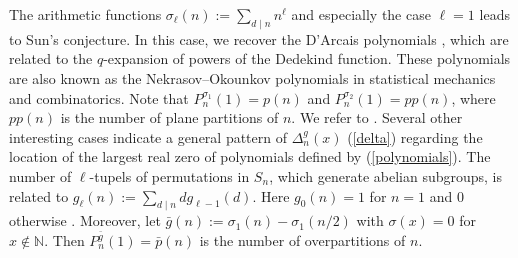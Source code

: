 \documentclass[11pt,reqno]{amsart}
\theoremstyle{plain}
\theoremstyle{remark}
\theoremstyle{definition}
\numberwithin{equation}{section}
\begin{document}
The arithmetic functions 
$\sigma_{\ell}(n):=\sum_{d \mid
n}n^{\ell}$
and especially the case $\ell=1$ leads to Sun's conjecture. 
In this case, we recover the D'Arcais polynomials \cite{DA13,HN20}, which are related to the $q$-expansion of powers of the Dedekind function. 
These polynomials are also known as the Nekrasov--Okounkov polynomials \cite{NO06,Ha10} in statistical mechanics and combinatorics.
Note that $P_n^{\sigma _{1}}\left( 1\right)
=p(n)$ and $P_n^{\sigma _{2}}\left( 1
\right) ={pp}(n)$, where ${pp}(n)$ is the number of plane partitions of $n$. We refer to
\cite{An98}. Several other interesting cases indicate
a general pattern of $\Delta_n^g(x)$ (\ref{delta}) regarding the location of the largest real zero of
polynomials defined by (\ref{polynomials}).
The number of $\ell$-tupels of permutations in $S_n$, which generate abelian subgroups, is related to 
$g_{\ell}(n):= \sum_{d \mid
n} dg_{\ell-1}(d)$. Here
$g_0(n)=1$ for $n=1$ and $0$ otherwise \cite{HH90,BF98,Ab24,ABDV24}. 
Moreover, let 
$\bar{g}(n):= \sigma_1(n)- \sigma_1(n/2)$ 
with $\sigma(x)=0$ for $x \not\in \mathbb{N}$. Then $P_n^{\bar{g}}(1)=\bar{p}(n)$ \cite{CL04} is the number of overpartitions of $n$.
\end{document}
